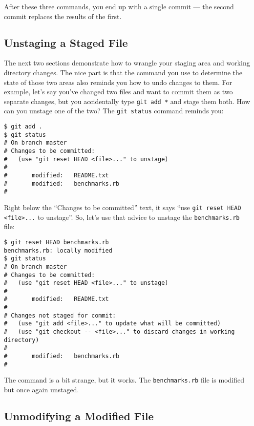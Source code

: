 \documentclass[a4paper]{book}
\begin{document}
After these three commands, you end up with a single commit --- the second commit replaces the results of the first.

\subsection{Unstaging a Staged File}

The next two sections demonstrate how to wrangle your staging area and working directory changes. The nice part is that the command you use to determine the state of those two areas also reminds you how to undo changes to them. For example, let's say you've changed two files and want to commit them as two separate changes, but you accidentally type \texttt{git add *} and stage them both. How can you unstage one of the two? The \texttt{git status} command reminds you:

\begin{shaded}\begin{verbatim}
$ git add .
$ git status
# On branch master
# Changes to be committed:
#   (use "git reset HEAD <file>..." to unstage)
#
#       modified:   README.txt
#       modified:   benchmarks.rb
#
\end{verbatim}\end{shaded}

Right below the “Changes to be committed” text, it says “use \texttt{git reset HEAD \textless{}file\textgreater{}...} to unstage”. So, let's use that advice to unstage the \texttt{benchmarks.rb} file:

\begin{shaded}\begin{verbatim}
$ git reset HEAD benchmarks.rb
benchmarks.rb: locally modified
$ git status
# On branch master
# Changes to be committed:
#   (use "git reset HEAD <file>..." to unstage)
#
#       modified:   README.txt
#
# Changes not staged for commit:
#   (use "git add <file>..." to update what will be committed)
#   (use "git checkout -- <file>..." to discard changes in working directory)
#
#       modified:   benchmarks.rb
#
\end{verbatim}\end{shaded}

The command is a bit strange, but it works. The \texttt{benchmarks.rb} file is modified but once again unstaged.

\subsection{Unmodifying a Modified File}
\end{document}
